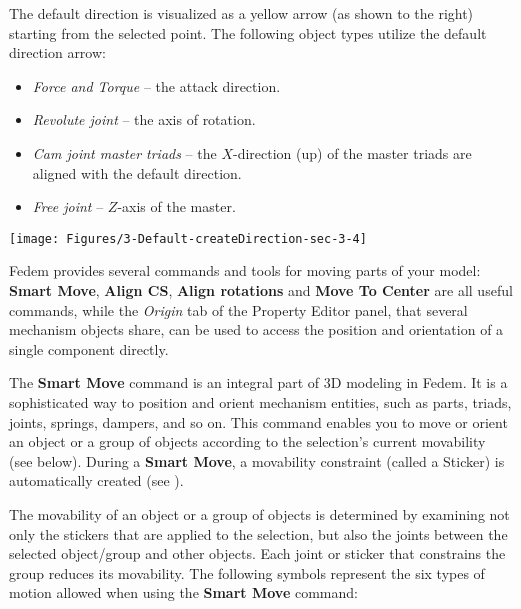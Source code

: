 \noindent
\begin{minipage}{0.7\textwidth}
  \raggedright
  The default direction is visualized as a yellow arrow (as shown to the right)
  starting from the selected point.
  The following object types utilize the default direction arrow:

  \begin{itemize}
  \item{\sl Force and Torque} -- the attack direction.
  \item{\sl Revolute joint} -- the axis of rotation.
  \item{\sl Cam joint master triads} -- the $X$-direction (up)
    of the master triads are aligned with the default direction.
  \item{\sl Free joint} -- $Z$-axis of the master.
  \end{itemize}
\end{minipage}%
\hfill\begin{minipage}{0.22\textwidth}
  \texttt{[image: Figures/3-Default-createDirection-sec-3-4]}
\end{minipage}



Fedem provides several commands and tools for moving parts of your model:
\textbf{Smart Move}, \textbf{Align CS}, \textbf{Align rotations} and
\textbf{Move To Center} are all useful commands, while the {\sl Origin} tab
of the Property Editor panel, that several mechanism objects share, can be used
to access the position and orientation of a single component directly.



The \textbf{Smart Move} command is an integral part of 3D modeling in Fedem.
It is a sophisticated way to position and orient mechanism entities,
such as parts, triads, joints, springs, dampers, and so on.
This command enables you to move or orient an object or a group of objects
according to the selection's current movability (see below).
During a \textbf{Smart Move}, a movability constraint (called a Sticker)
is automatically created (see ).


The movability of an object or a group of objects is determined by examining not
only the stickers that are applied to the selection, but also the joints between
the selected object/group and other objects.
Each joint or sticker that constrains the group reduces its movability.
The following symbols represent the six types of motion allowed when using
the \textbf{Smart Move} command:

